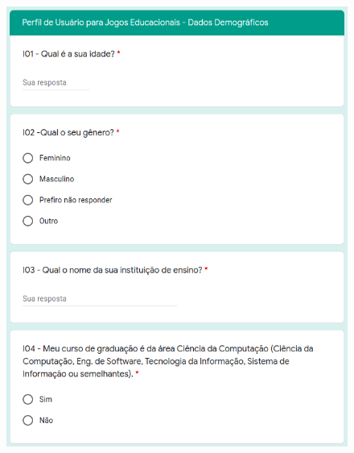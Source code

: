 \begin{apendicesenv}
\begin{figure}[htbp]
{        \includegraphics[keepaspectratio=true,scale=1.25]{figuras/apendice/survey2.png}
        \label{Fig:survey_pt2.png}
    }
    \quad
\end{figure}
\end{apendicesenv}
